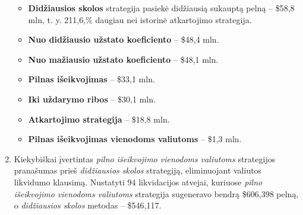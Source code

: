 \documentclass[]{VUMIFTemplateClass}
\begin{document}
\begin{enumerate}
\begin{itemize}
\item \textbf{Didžiausios skolos} strategija pasiekė didžiausią sukauptą pelną – \$58,8 mln, t. y. 211,6,\% daugiau nei istorinė atkartojimo strategija.
\item \textbf{Nuo didžiausio užstato koeficiento} – \$48,4 mln.
\item \textbf{Nuo mažiausio užstato koeficiento} – \$48,1 mln.
\item \textbf{Pilnas išeikvojimas} – \$33,1 mln.
\item \textbf{Iki uždarymo ribos} – \$30,1 mln.
\item \textbf{Atkartojimo strategija} – \$18,8 mln.
\item \textbf{Pilnas išeikvojimas vienodoms valiutoms} – \$1,3 mln.
\end{itemize}

\item Kiekybiškai įvertintas \textit{pilno išeikvojimo vienodoms valiutoms} strategijos pranašumas prieš \textit{didžiausios skolos} strategiją, eliminuojant valiutos likvidumo klausimą. Nustatyti 94 likvidacijos atvejai, kuriuose \textit{pilno išeikvojimo vienodoms valiutoms} strategija sugeneravo bendrą \$606,398 pelną, o \textit{didžiausios skolos} metodas – \$546,117.
\end{enumerate}
\end{document}
